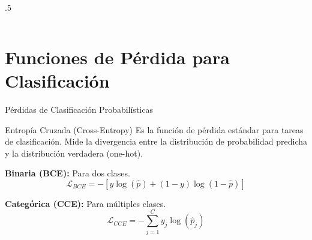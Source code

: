 \documentclass[aspectratio=169, 10pt]{beamer}
\begin{document}
\begin{frame}
\begin{columns}[T]
\begin{column}{.5\textwidth}
	\end{column}
	\end{columns}


\end{frame}

\section{Funciones de Pérdida para Clasificación}

\begin{frame}{Pérdidas de Clasificación Probabilísticas}
    \begin{block}{Entropía Cruzada (Cross-Entropy)}
        Es la función de pérdida estándar para tareas de clasificación. Mide la divergencia entre la distribución de probabilidad predicha y la distribución verdadera (one-hot).
        
        \textbf{Binaria (BCE):} Para dos clases.
        $$ \mathcal{L}_{BCE} = -[y \log(\hat{p}) + (1-y) \log(1-\hat{p})] $$
        
        \textbf{Categórica (CCE):} Para múltiples clases.
        $$ \mathcal{L}_{CCE} = - \sum_{j=1}^{C} y_j \log(\hat{p}_j) $$
    \end{block}
    
\end{frame}
\end{document}
